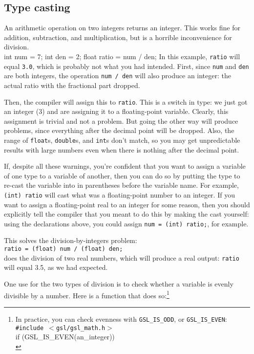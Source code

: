 \documentclass[12pt]{article}
\begin{document}
\subsection{Type casting}\label{casting}   An arithmetic operation on two integers returns an integer. This works fine for
addition, subtraction, and multiplication, but is a horrible inconvenience for division.\\
int num = 7;
int den = 2;
float ratio = num / den;
In this example, {\tt ratio} will equal {\tt 3.0}, which is probably not what you had intended. 
First, since {\tt num} and {\tt den} are both integers, the operation
{\tt num / den} will also produce an integer: the actual ratio with the
fractional part dropped.

Then, the compiler will assign this to {\tt ratio}. This is a switch in type: we just got an integer (3)
and are assigning it to a floating-point variable. Clearly, this assignment is trivial and not a problem.
But going the other way will produce problems, since everything after the decimal point will be
dropped.
Also, the range of {\tt float}s, {\tt double}s, and {\tt int}s don't match, so you may get unpredictable
results with large numbers even when there is nothing after the decimal point.


If, despite all these warnings, you're confident that you want to assign a variable of one type
to a variable of another, then you can do so by putting the type to
re-cast the variable into in parentheses before the variable name. For
example, {\tt (int) ratio} will cast what was a floating-point number to an integer. 
If you want to assign a floating-point real to an integer for some reason, then you should explicitly tell
the compiler that you meant to do this by making the cast yourself: using the declarations above, 
you could assign {\tt num = (int) ratio;}, for example. 

This solves the division-by-integers problem: \\
{\tt ratio = (float) num / (float) den;}\\
does the division of two real numbers, which will produce a real output: {\tt ratio} will equal 3.5, as we
had expected.


One use for the two types of division is to check whether a variable is evenly divisible by a number. Here
is a function that does so:\footnote{In practice, you can check evenness
with {\tt GSL\_IS\_ODD}, or {\tt GSL\_IS\_EVEN}:\\ 
{\tt \#include $<$gsl/gsl\_math.h$>$}\\
if (GSL\_IS\_EVEN(an\_integer))\\
\phantom{hello.}{\tt do\_something();}
}
\end{document}
